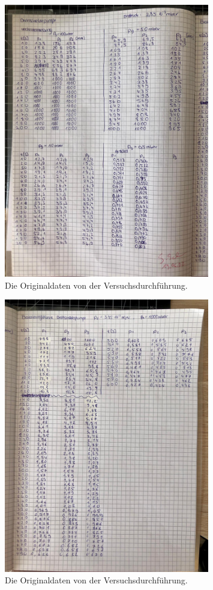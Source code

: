 \begin{figure}
    \centering
    \includegraphics[width=0.8\textwidth]{bilder/Anhang3.jpg}
    \caption{Die Originaldaten von der Versuchsdurchführung.}
    \label{fig:originaldaten3}
\end{figure}
\begin{figure}
    \centering
    \includegraphics[width=0.8\textwidth]{bilder/Anhang4.jpg}
    \caption{Die Originaldaten von der Versuchsdurchführung.}
    \label{fig:originaldaten4}
\end{figure}